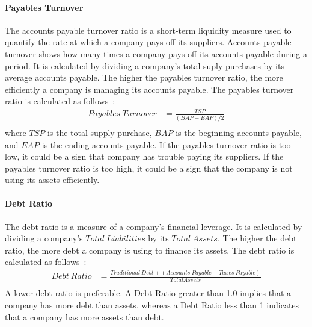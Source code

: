 \documentclass[../xlapes02]{subfiles}
\begin{document}
    \paragraph{Payables Turnover}\label{par:payables-turnover}
    The accounts payable turnover ratio is a short-term liquidity measure used to quantify the rate at which a company pays off its suppliers. Accounts payable turnover shows how many times a company pays off its accounts payable during a period. It is calculated by dividing a company's total suply purchases by its average accounts payable. The higher the payables turnover ratio, the more efficiently a company is managing its accounts payable. The payables turnover ratio is calculated as follows~\cite{investopedia}:
    \begin{equation}
        \begin{split}
            Payables\ Turnover&=\frac{TSP}{(BAP+EAP)/2}\\
        \end{split}
    \end{equation}
    where $TSP$ is the total supply purchase, $BAP$ is the beginning accounts payable, and $EAP$ is the ending accounts payable. If the payables turnover ratio is too low, it could be a sign that company has trouble paying its suppliers. If the payables turnover ratio is too high, it could be a sign that the company is not using its assets efficiently.

    \paragraph{Debt Ratio}\label{par:debt-ratio}
    The debt ratio is a measure of a company's financial leverage. It is calculated by dividing a company's $Total\ Liabilities$ by its $Total\ Assets$. The higher the debt ratio, the more debt a company is using to finance its assets. The debt ratio is calculated as follows~\cite{investopedia}:
    \begin{equation}
        \begin{split}
            Debt\ Ratio&=\frac{Traditional\ Debt+(Accounts\ Payable+Taxes\ Payable)}{Total Assets}\\
        \end{split}
    \end{equation}
    A lower debt ratio is preferable. A Debt Ratio greater than 1.0 implies that a company has more debt than assets, whereas a Debt Ratio less than 1 indicates that a company has more assets than debt.
\end{document}

